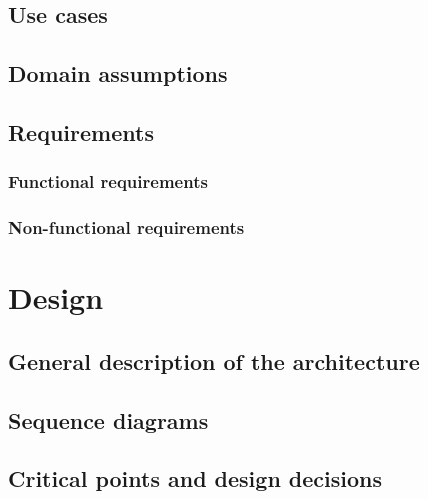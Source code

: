 \documentclass[a4paper]{article}
\begin{document}
    \newpage

    \subsection{Use cases}

    \subsection{Domain assumptions}

    \subsection{Requirements}

    \subsubsection{Functional requirements}

    \subsubsection{Non-functional requirements}

    \newpage

    \section{Design}

    \subsection{General description of the architecture}

    \subsection{Sequence diagrams}

    \subsection{Critical points and design decisions}
\end{document}
